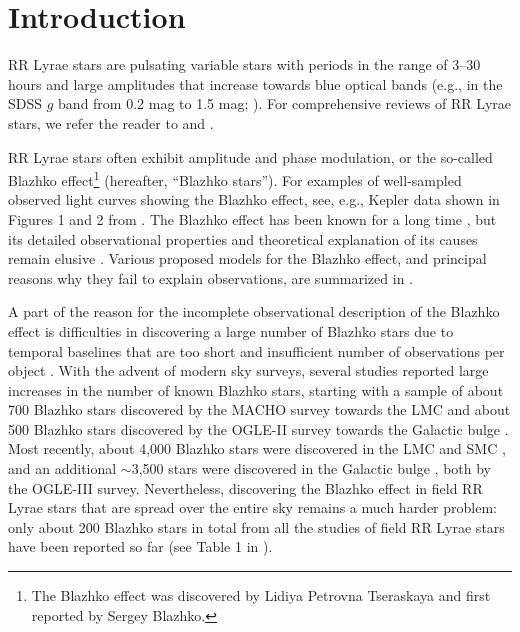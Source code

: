 \section{Introduction\label{sec:intro}}

RR Lyrae stars are pulsating variable stars with periods in the range of 3--30 hours and large amplitudes
that increase towards blue optical bands (e.g., in the SDSS $g$ band from 0.2 mag to 1.5 mag;
\citealt{2010ApJ...708..717S}). For comprehensive reviews of RR Lyrae stars, we refer the reader to \cite{1995CAS....27.....S} and \cite{2009Ap&SS.320..261C}.

RR Lyrae stars often exhibit amplitude and phase modulation, or the so-called Blazhko effect\footnote{The Blazhko effect was discovered by Lidiya Petrovna Tseraskaya and first reported by Sergey Blazhko.} (hereafter,
``Blazhko stars''). For examples of well-sampled observed light curves showing the Blazhko effect, see,  e.g., Kepler
data shown in Figures 1 and 2 from \cite{2010MNRAS.409.1585B}. The Blazhko effect has been known for a long time \citep{1907AN....175..325B}, but its detailed observational properties and theoretical explanation of its causes remain elusive
\citep{2008JPhCS.118a2060K,2009AIPC.1170..261K,2014IAUS..301..241S}.
Various proposed models for the Blazhko effect, and principal reasons why they fail to explain observations, are summarized in \cite{2016CoKon.105...61K}. 

A part of the reason for the incomplete observational description of the Blazhko effect is difficulties in discovering a large number 
of Blazhko stars due to temporal baselines that are too short and insufficient number of observations per object
\citep{2016CoKon.105...61K,2022ApJS..258....4H}. With the advent of modern sky surveys, several studies
reported large increases in the number of known Blazhko stars, starting with a sample of about 700 Blazhko
stars discovered by the MACHO survey towards the LMC \citep{2003ApJ...598..597A} and about 500 Blazhko stars
discovered by the OGLE-II survey towards the Galactic bulge \citep{2003AcA....53..307M}. 
Most recently,  about 4,000 Blazhko stars were discovered in the LMC and SMC 
\citep{2009AcA....59....1S, 2010AcA....60..165S}, and an additional $\sim$3,500 stars were discovered in the
Galactic bulge \citep{2011AcA....61....1S, 2017MNRAS.466.2602P}, both by the OGLE-III survey. Nevertheless, discovering the Blazhko
effect in field RR Lyrae stars that are spread over the entire sky remains a much harder problem: only about
200 Blazhko stars in total from all the studies of field RR Lyrae stars have been reported so far (see Table 1
in \citealt{2016CoKon.105...61K}). 

